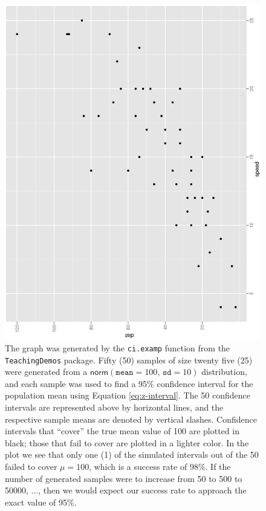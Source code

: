\documentclass[captions=tableheading]{scrbook}
\begin{document}
\begin{figure}[th]
    \includegraphics[angle=270, totalheight=4in]{img/carscatter.ps}
    \caption[Simulated confidence intervals]{\small The graph was generated by the \texttt{ci.examp} function from the \texttt{TeachingDemos} package. Fifty (50) samples of size twenty five (25) were generated from a \( \mathsf{norm}(\mathtt{mean}=100,\,\mathtt{sd}=10) \) distribution, and each sample was used to find a 95\% confidence interval for the population mean using Equation \ref{eq:z-interval}. The 50 confidence intervals are represented above by horizontal lines, and the respective sample means are denoted by vertical slashes. Confidence intervals that ``cover'' the true mean value of 100 are plotted in black; those that fail to cover are plotted in a lighter color. In the plot we see that only one (1) of the simulated intervals out of the 50 failed to cover \(\mu=100\), which is a success rate of 98\%. If the number of generated samples were to increase from 50 to 500 to 50000, ..., then we would expect our success rate to approach the exact value of 95\%.}
    \label{fig:Scatter-cars}
  \end{figure}
\end{document}
